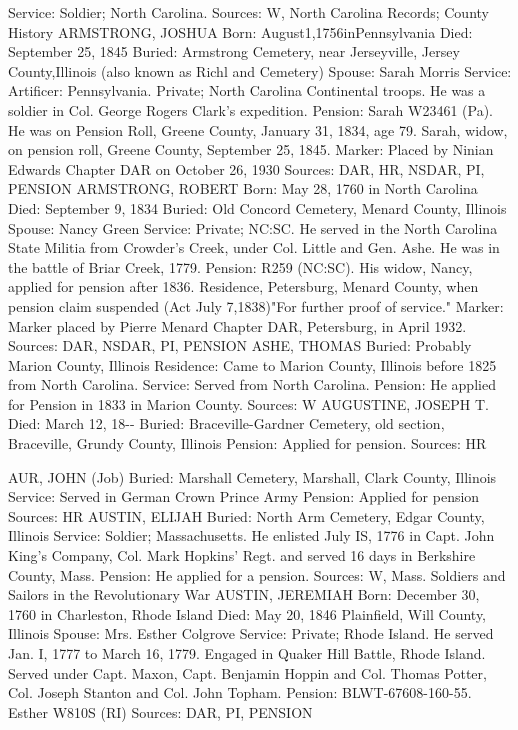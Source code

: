Service: Soldier; North Carolina. 
Sources: W, North Carolina Records; County History ARMSTRONG, JOSHUA 
Born: August1,1756inPennsylvania 
Died: September 25, 1845 
Buried: Armstrong Cemetery, near Jerseyville, Jersey County,Illinois (also known as Richl and Cemetery) 
Spouse: Sarah Morris 
Service: Artificer: Pennsylvania. Private; North Carolina Continental troops. He was a soldier in Col. George Rogers Clark's expedition. 
Pension: Sarah W23461 (Pa). He was on Pension Roll, Greene County, January 31, 1834, age 79. Sarah, widow, on pension roll, Greene County, September 25, 1845. 
Marker: Placed by Ninian Edwards Chapter DAR on October 26, 1930 
Sources: DAR, HR, NSDAR, PI, PENSION 
ARMSTRONG, ROBERT 
Born: May 28, 1760 in North Carolina Died: September 9, 1834 
Buried: Old Concord Cemetery, Menard County, Illinois Spouse: Nancy Green 
Service: Private; NC:SC. He served in the North Carolina State Militia from Crowder's Creek, under Col. Little and Gen. Ashe. He was in the battle of Briar Creek, 1779. 
Pension: R259 (NC:SC). His widow, Nancy, applied for pension after 1836. Resi­dence, Petersburg, Menard County, when pension claim suspended (Act July 7,1838)"For further proof of service." 
Marker: Marker placed by Pierre Menard Chapter DAR, Petersburg, in April 1932. 
Sources: DAR, NSDAR, PI, PENSION 
ASHE, THOMAS 
Buried: Probably Marion County, Illinois 
Residence: Came to Marion County, Illinois before 1825 from North Carolina. 
Service: Served from North Carolina. Pension: He applied for Pension in 1833 in Marion County. 
Sources: W 
AUGUSTINE, JOSEPH T. 
Died: March 12, 18-­-
Buried: Braceville-Gardner Cemetery, old section, Braceville, Grundy County, Illinois 
Pension: Applied for pension. 
Sources: HR 

AUR, JOHN (Job) 
Buried: Marshall Cemetery, Marshall, Clark County, Illinois 
Service: Served in German Crown Prince Army 
Pension: Applied for pension 
Sources: HR 
AUSTIN, ELIJAH 
Buried: North Arm Cemetery, Edgar County, Illinois 
Service: Soldier; Massachusetts. He enlisted July IS, 1776 in Capt. John King's Company, Col. Mark Hopkins' Regt. and served 16 days in Berkshire County, Mass. 
Pension: He applied for a pension. 
Sources: W, Mass. Soldiers and Sailors in the Revolutionary War 
AUSTIN, JEREMIAH 
Born: December 30, 1760 in Charleston, Rhode Island 
Died: May 20, 1846 Plainfield, Will County, Illinois 
Spouse: Mrs. Esther Colgrove 
Service: Private; Rhode Island. He served Jan. I, 1777 to March 16, 1779. En­gaged in Quaker Hill Battle, Rhode Island. Served under Capt. Maxon, Capt. Benjamin Hoppin and Col. Thomas Potter, Col. Joseph Stanton and Col. John Topham. 
Pension: BLWT-67608-160-55. Esther W810S (RI) 
Sources: DAR, PI, PENSION 



